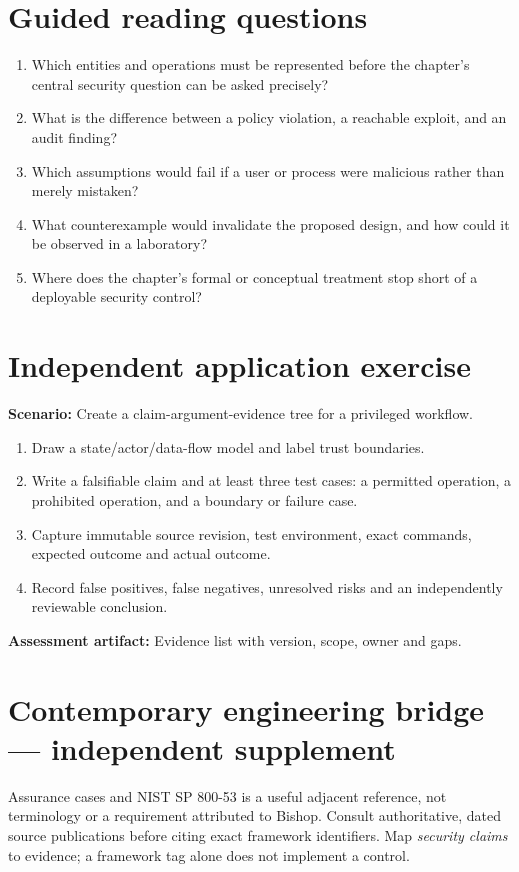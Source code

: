 \documentclass[10pt,letterpaper]{article}
\begin{document}
\section{Guided reading questions}
\begin{enumerate}
\item Which entities and operations must be represented before the chapter's central security question can be asked precisely?
\item What is the difference between a policy violation, a reachable exploit, and an audit finding?
\item Which assumptions would fail if a user or process were malicious rather than merely mistaken?
\item What counterexample would invalidate the proposed design, and how could it be observed in a laboratory?
\item Where does the chapter's formal or conceptual treatment stop short of a deployable security control?
\end{enumerate}
\section{Independent application exercise}
\textbf{Scenario:} Create a claim-argument-evidence tree for a privileged workflow.
\begin{enumerate}
\item Draw a state/actor/data-flow model and label trust boundaries.
\item Write a falsifiable claim and at least three test cases: a permitted operation, a prohibited operation, and a boundary or failure case.
\item Capture immutable source revision, test environment, exact commands, expected outcome and actual outcome.
\item Record false positives, false negatives, unresolved risks and an independently reviewable conclusion.
\end{enumerate}
\textbf{Assessment artifact:} Evidence list with version, scope, owner and gaps.
\section{Contemporary engineering bridge --- independent supplement}
Assurance cases and NIST SP 800-53 is a useful adjacent reference, not terminology or a requirement attributed to Bishop. Consult authoritative, dated source publications before citing exact framework identifiers. Map \emph{security claims} to evidence; a framework tag alone does not implement a control.
\end{document}
